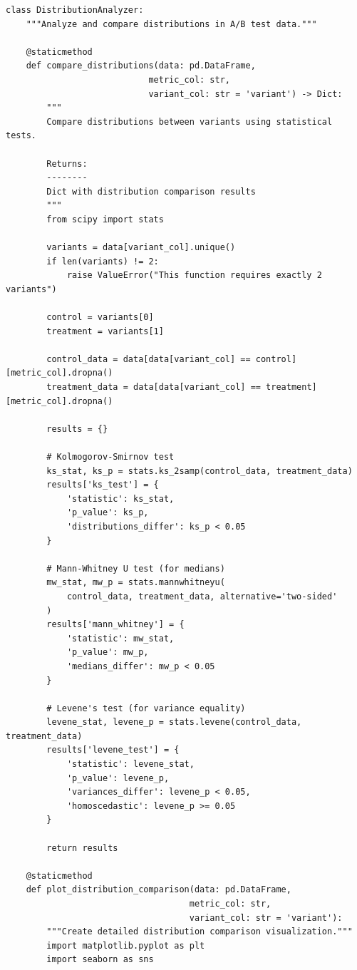 \lstset{language=Python, caption=Distribution Analysis Functions}
\begin{lstlisting}
class DistributionAnalyzer:
    """Analyze and compare distributions in A/B test data."""

    @staticmethod
    def compare_distributions(data: pd.DataFrame,
                            metric_col: str,
                            variant_col: str = 'variant') -> Dict:
        """
        Compare distributions between variants using statistical tests.

        Returns:
        --------
        Dict with distribution comparison results
        """
        from scipy import stats

        variants = data[variant_col].unique()
        if len(variants) != 2:
            raise ValueError("This function requires exactly 2 variants")

        control = variants[0]
        treatment = variants[1]

        control_data = data[data[variant_col] == control][metric_col].dropna()
        treatment_data = data[data[variant_col] == treatment][metric_col].dropna()

        results = {}

        # Kolmogorov-Smirnov test
        ks_stat, ks_p = stats.ks_2samp(control_data, treatment_data)
        results['ks_test'] = {
            'statistic': ks_stat,
            'p_value': ks_p,
            'distributions_differ': ks_p < 0.05
        }

        # Mann-Whitney U test (for medians)
        mw_stat, mw_p = stats.mannwhitneyu(
            control_data, treatment_data, alternative='two-sided'
        )
        results['mann_whitney'] = {
            'statistic': mw_stat,
            'p_value': mw_p,
            'medians_differ': mw_p < 0.05
        }

        # Levene's test (for variance equality)
        levene_stat, levene_p = stats.levene(control_data, treatment_data)
        results['levene_test'] = {
            'statistic': levene_stat,
            'p_value': levene_p,
            'variances_differ': levene_p < 0.05,
            'homoscedastic': levene_p >= 0.05
        }

        return results

    @staticmethod
    def plot_distribution_comparison(data: pd.DataFrame,
                                    metric_col: str,
                                    variant_col: str = 'variant'):
        """Create detailed distribution comparison visualization."""
        import matplotlib.pyplot as plt
        import seaborn as sns


\end{lstlisting}

